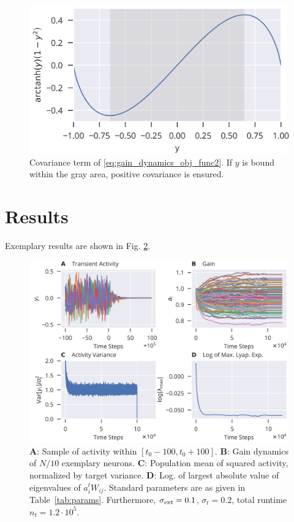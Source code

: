 \documentclass[10pt,a4paper]{article}
\begin{document}
\begin{figure}
	\centering
	\includegraphics{../plots/gain_grad_descent.png}
	\caption{Covariance term of \eqref{eq:gain_dynamics_obj_func2}. If $y$ is bound within the gray area, positive covariance is ensured.}
	\label{fig:gain_cov}
\end{figure}

\section{Results}
Exemplary results are shown in Fig. \ref{fig:ex_results}.

\begin{figure}[h]
\includegraphics[width=\textwidth]{../plots/res_comp.png}
\caption{{\bf A}: Sample of activity within $\left[ t_0 - 100, t_0 + 100 \right]$. {\bf B}: Gain dynamics of $N/10$ exemplary neurons. {\bf C}: Population mean of squared activity, normalized by target variance. {\bf D}: Log. of largest absolute value of eigenvalues of $a_i^t W_{ij} $. Standard parameters are as given in Table~\ref{tab:params}. Furthermore, $\sigma_{\rm ext} = 0.1$, $\sigma_{t} = 0.2$, total runtime $n_t = 1.2\cdot10^5$. }
\label{fig:ex_results}
\end{figure}
\end{document}
